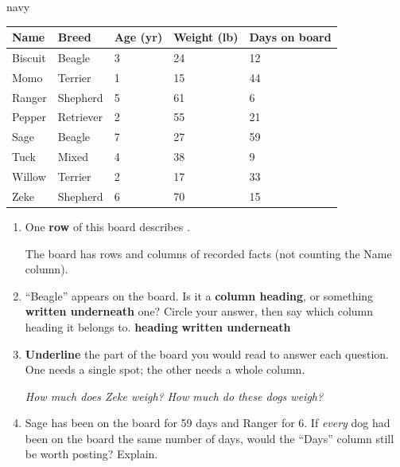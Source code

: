 \vspace{0.04in}

\begin{scenariobox}{navy}
\small
\renewcommand{\arraystretch}{1.25}
\begin{tabularx}{\linewidth}{@{} l Y Y Y Y @{}}
\textbf{Name} & \textbf{Breed} & \textbf{Age (yr)} & \textbf{Weight (lb)} & \textbf{Days on board} \\
\hline
Biscuit & Beagle    & 3 & 24 & 12 \\
Momo    & Terrier   & 1 & 15 & 44 \\
Ranger  & Shepherd  & 5 & 61 &  6 \\
Pepper  & Retriever & 2 & 55 & 21 \\
Sage    & Beagle    & 7 & 27 & 59 \\
Tuck    & Mixed     & 4 & 38 &  9 \\
Willow  & Terrier   & 2 & 17 & 33 \\
Zeke    & Shepherd  & 6 & 70 & 15 \\
\hline
\end{tabularx}

\normalsize
\begin{enumerate}[label=\textbf{\alph*.}, leftmargin=1.8em, itemsep=8pt]
  \item One \textbf{row} of this board describes \blank{5.2cm}.

        The board has \blank{1.4cm} rows and \blank{1.4cm} columns of recorded facts
        (not counting the Name column).
  \item ``Beagle'' appears on the board. Is it a \textbf{column heading}, or something
        \textbf{written underneath} one? Circle your answer, then say which column heading it
        belongs to. \hfill \textbf{heading} \qquad \textbf{written underneath}
        \answerspace{1.4cm}{}
  \item \textbf{Underline} the part of the board you would read to answer each question.
        One needs a single spot; the other needs a whole column.

        \emph{How much does Zeke weigh?} \qquad \emph{How much do these dogs weigh?}
        \answerspace{1.6cm}{}
  \item Sage has been on the board for 59 days and Ranger for 6. If \emph{every} dog had been
        on the board the same number of days, would the ``Days'' column still be worth posting?
        Explain.
        \answerspace{2.0cm}{}
\end{enumerate}
\end{scenariobox}

